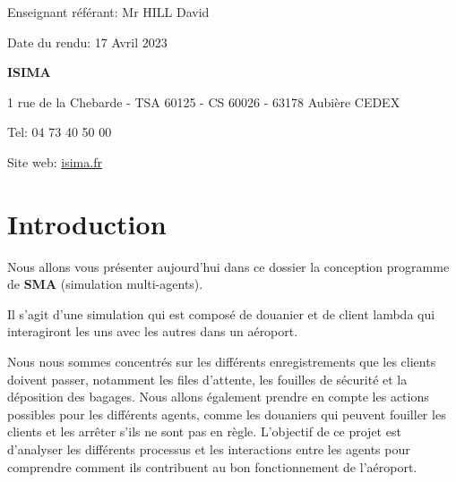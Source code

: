 \documentclass[12pt,french]{article} %
\begin{document}
\begin{titlepage}
  \vspace*{2cm} 
  
  \begin{flushright}\footnotesize %
    Enseignant référant: Mr HILL David
    
    Date du rendu: 17 Avril 2023
    
  \end{flushright}
  
  \begin{flushleft}\small %
    \textbf{ISIMA}
    \footnotesize
    
    1 rue de la Chebarde - TSA 60125 - CS 60026 - 63178 Aubière CEDEX
    
    Tel: 04 73 40 50 00
    
    Site web: \href{https://www.isima.fr/}{isima.fr}\newline
    	
  \end{flushleft}
\end{titlepage}	


\renewcommand{\contentsname}{Sommaire}
\normalsize\tableofcontents %

\bigskip

\section{Introduction}

Nous allons vous présenter aujourd'hui dans ce dossier la conception programme de \textbf{SMA} (simulation multi-agents).

\bigskip

Il s'agit d'une simulation qui est composé de douanier et de client lambda qui interagiront les uns avec les autres dans un aéroport.

\bigskip

 Nous nous sommes concentrés sur les différents enregistrements que les clients doivent passer, notamment les files d'attente, les fouilles de sécurité et la déposition des bagages. Nous allons également prendre en compte les actions possibles pour les différents agents, comme les douaniers qui peuvent fouiller les clients et les arrêter s'ils ne sont pas en règle. L'objectif de ce projet est d'analyser les différents processus et les interactions entre les agents pour comprendre comment ils contribuent au bon fonctionnement de l'aéroport.
 
\end{document}
